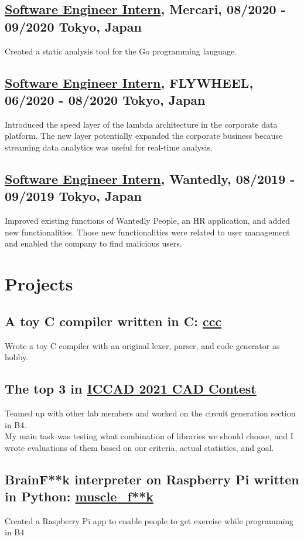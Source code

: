 \documentclass[10pt]{article}
\begin{document}
  \subsection*{\underline{Software Engineer Intern}, Mercari, 08/2020 - 09/2020 \hfill Tokyo, Japan}
    Created a static analysis tool for the Go programming language.
  \subsection*{\underline{Software Engineer Intern}, FLYWHEEL, 06/2020 - 08/2020 \hfill Tokyo, Japan}
    Introduced the speed layer of the lambda architecture in the corporate data platform.
    The new layer potentially expanded the corporate business because streaming data analytics was useful for real-time analysis.
  \subsection*{\underline{Software Engineer Intern}, Wantedly, 08/2019 - 09/2019 \hfill Tokyo, Japan}
    Improved existing functions of Wantedly People, an HR application, and added new functionalities.
    Those new functionalities were related to user management and enabled the company to find malicious users.

\section*{Projects}
  \subsection*{A toy C compiler written in C: \href{https://github.com/diohabara/ccc}{ccc}}
    Wrote a toy C compiler with an original lexer, parser, and code generator as hobby.
  \subsection*{The top 3 in \href{http://iccad-contest.org/2021/}{ICCAD 2021 CAD Contest}}
    Teamed up with other lab members and worked on the circuit generation section in B4.
    \\
    My main task was testing what combination of libraries we should choose, and I wrote evaluations of them based on our criteria, actual statistics, and goal.
  \subsection*{BrainF**k interpreter on Raspberry Pi written in Python: \href{https://github.com/diohabara/muscle_fuck}{muscle\_f**k}}
    Created a Raspberry Pi app to enable people to get exercise while programming in B4
\end{document}
